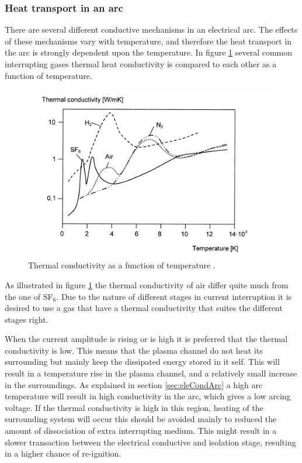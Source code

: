 \documentclass[10pt,a4paper]{article} %
\begin{document}
\subsubsection{Heat transport in an arc}
There are several different conductive mechanisms in an electrical arc. The effects of these mechanisms vary with temperature, and therefore the heat transport in the arc is strongly dependent upon the temperature. In figure \ref{fig:tempConGas} several common interrupting gases thermal heat conductivity is compared to each other as a function of temperature.

\begin{figure}[H]
\centering
\includegraphics[scale=0.8]{Bilder/Theory/thermalCond.png}
\caption{Thermal conductivity as a function of temperature \cite{bib:HVEbreak}.} \label{fig:tempConGas}
\end{figure}

As illustrated in figure \ref{fig:tempConGas} the thermal conductivity of air differ quite much from the one of SF$_6$. Due to the nature of different stages in current interruption it is desired to use a gas that have a thermal conductivity that suites the different stages right. 

When the current amplitude is rising or is high it is preferred that the thermal conductivity is low. This means that the plasma channel do not heat its surrounding but mainly keep the dissipated energy stored in it self. This will result in a temperature rise in the plasma channel, and a relatively small increase in the surroundings. As explained in section \ref{sec:eleCondArc} a high arc temperature will result in high conductivity in the arc, which gives a low arcing voltage. If the thermal conductivity is high in this region, heating of the surrounding system will occur this should be avoided mainly to reduced the amount of dissociation of extra interrupting medium. This might result in a slower transaction between the electrical conductive and isolation stage, resulting in a higher chance of re-ignition.
\end{document}
